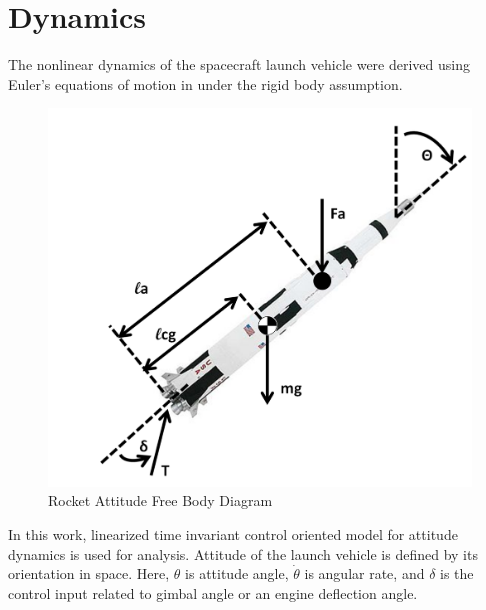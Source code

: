 \documentclass[12pt]{article}
\begin{document}
	\section{Dynamics}
	The nonlinear dynamics of the spacecraft launch vehicle were derived using Euler's equations of motion in \cite{cite1} under the rigid body assumption. 
	\begin{figure}[!h]
		\centering
		\includegraphics[width=0.6\linewidth]{Rocket}
		\caption{Rocket Attitude Free Body Diagram}
		\label{fig:rocket}
	\end{figure}
	In this work, linearized time invariant control oriented model for attitude dynamics is used for analysis. Attitude of the launch vehicle is defined by its orientation in space. Here, $\theta$ is attitude angle, $\dot{\theta}$ is angular rate, and $\delta$ is the control input related to gimbal angle or an engine deflection angle. 
	
\end{document}
